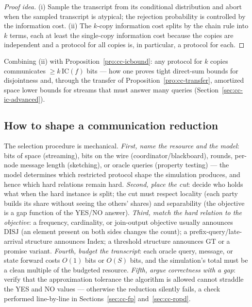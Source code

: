 \begin{proof}[Proof idea]
(i) Sample the transcript from its conditional distribution and abort when the sampled
transcript is atypical; the rejection probability is controlled by the information
cost. (ii) The $k$-copy information cost splits by the chain rule into $k$ terms, each
at least the single-copy information cost because the copies are independent and a
protocol for all copies is, in particular, a protocol for each.
\end{proof}

Combining (ii) with Proposition~\ref{pro:cc-icbound}: any protocol for $k$ copies
communicates $\ge k\,\mathrm{IC}(f)$ bits --- how one proves tight direct-sum bounds
for disjointness \citep{communication-complexity-bg5} and, through the transfer of
Proposition~\ref{pro:cc-transfer}, amortized space lower bounds for streams that must
answer many queries (Section~\ref{sec:cc-ic-advanced}).

\subsection{How to shape a communication reduction}
\label{sec:cc-how}

The selection procedure is mechanical. \emph{First, name the resource and the model}:
bits of space (streaming), bits on the wire (coordinator/blackboard), rounds, per-node
message length (sketching), or oracle queries (property testing) --- the model
determines which restricted protocol shape the simulation produces, and hence which
hard relations remain hard. \emph{Second, place the cut}: decide who holds what when
the hard instance is split; the cut must respect locality (each party builds its share
without seeing the others' shares) and separability (the objective is a gap function
of the YES/NO answer). \emph{Third, match the hard relation to the objective}: a
frequency, cardinality, or join-output objective usually announces $\mathrm{DISJ}$ (an
element present on both sides changes the count); a prefix-query/late-arrival
structure announces $\mathrm{Index}$; a threshold structure announces $\mathrm{GT}$ or
a promise variant. \emph{Fourth, budget the transcript}: each oracle query, message,
or state forward costs $O(1)$ bits or $O(S)$ bits, and the simulation's total must be
a clean multiple of the budgeted resource. \emph{Fifth, argue correctness with a gap}:
verify that the approximation tolerance the algorithm is allowed cannot straddle the
YES and NO values --- otherwise the reduction silently fails, a check performed
line-by-line in Sections~\ref{sec:cc-fp} and~\ref{sec:cc-ropd}.


